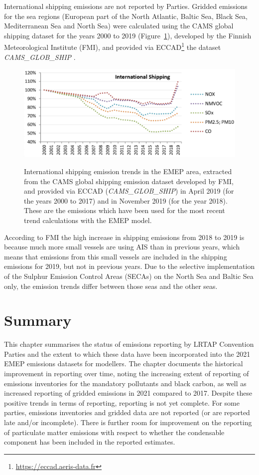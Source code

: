 International shipping emissions are not reported by Parties. Gridded emissions for the sea regions (European part of the North Atlantic, Baltic Sea, Black Sea, Mediterranean Sea and North Sea) were calculated using the CAMS global shipping dataset \citep{CAMSemis2019} for the years 2000 to 2019 (Figure~\ref{fig:CEIP10}), developed by the Finnish Meteorological Institute (FMI), and provided via ECCAD\footnote{\url{https://eccad.aeris-data.fr}} the dataset {\it CAMS\_GLOB\_SHIP} \citep{ECCAD}.

\begin{figure}[h]
\centering
{\includegraphics*[viewport=1 1 553 230,clip,width=0.75\linewidth]{FIGS_CEIP/Fig10.pdf}}
\caption{International shipping emission trends in the EMEP area, extracted from the CAMS global shipping emission dataset developed by FMI, and provided via ECCAD ({\it CAMS\_GLOB\_SHIP}) in April 2019 (for the years 2000 to 2017) and in November 2019 (for the year 2018). These are the emissions which have been used for the most recent trend calculations with the EMEP model.
}
\label{fig:CEIP10}
\end{figure}


According to FMI the high increase in shipping emissions from 2018 to 2019 is because much more small vessels are using AIS than in previous years, which means that emissions from this small vessels are included in the shipping emissions for 2019, but not in previous years.
Due to the selective implementation of the Sulphur Emission Control Areas (SECAs) on the North Sea and Baltic Sea only, the emission trends differ between those seas and the other seas.



\section{Summary}

This chapter summarises the status of emissions reporting by LRTAP Convention Parties and the extent to which these data have been incorporated into the 2021 EMEP emissions datasets for modellers. The chapter documents the historical improvement in reporting over time, noting the increasing extent of reporting of emissions inventories for the mandatory pollutants and black carbon, as well as increased reporting of gridded emissions in 2021 compared to 2017. Despite these positive trends in terms of reporting, reporting is not yet complete. For some parties, emissions inventories and gridded data are not reported (or are reported late and/or incomplete). There is further room for improvement on the reporting of particulate matter emissions with respect to whether the condensable component has been included in the reported estimates.


